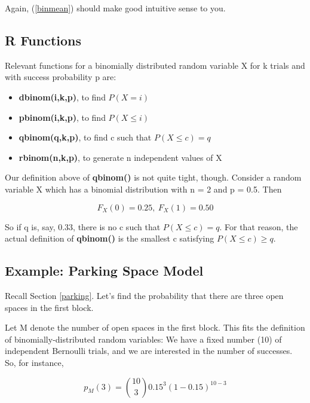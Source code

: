 Again, (\ref{binmean}) should make good intuitive sense to you.

\subsection{R Functions} 

Relevant functions for a binomially  distributed random variable X for k
trials and with success probability p are:

\begin{itemize}

\item {\bf dbinom(i,k,p)}, to find $P(X = i)$

\item {\bf pbinom(i,k,p)}, to find $P(X \leq i)$

\item {\bf qbinom(q,k,p)}, to find c such that $P(X \leq c) = q$ 

\item {\bf rbinom(n,k,p)}, to generate n independent values of X

\end{itemize}

Our definition above of {\bf qbinom()} is not quite tight, though.
Consider a random variable X which has a binomial distribution with n =
2 and p = 0.5.  Then

\begin{equation}
F_X(0) = 0.25, ~ F_X(1) = 0.50
\end{equation}

So if q is, say, 0.33, there is no c such that $P(X \leq c) = q$.  For
that reason, the actual definition of {\bf qbinom()} is the smallest c
satisfying $P(X \leq c) \ge q$.

\subsection{Example:  Parking Space Model}

Recall Section \ref{parking}.  Let's find the probability that there are
three open spaces in the first block.

Let M denote the number of open spaces in the first block.  This fits
the definition of binomially-distributed random variables:  We have a
fixed number (10) of independent Bernoulli trials, and we are interested
in the number of successes.  So, for instance,

\begin{equation}
p_{M}(3) = \binom{10}{3} 0.15^3 (1 - 0.15)^{10-3}
\end{equation}


